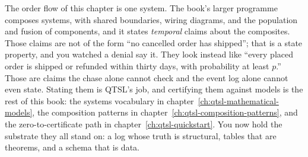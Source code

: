 The order flow of this chapter is one system. The book's larger
programme composes systems, with shared boundaries, wiring diagrams,
and the population and fusion of components, and it states
\emph{temporal} claims about the composites. Those claims are not of
the form ``no cancelled order has shipped''; that is a state property,
and you watched a denial say it. They look instead like ``every placed
order is shipped or refunded within thirty days, with probability at
least $p$.'' Those are claims the chase alone cannot check and the
event log alone cannot even state. Stating them is QTSL's job, and
certifying them against models is the rest of this book: the systems
vocabulary in chapter~\ref{ch:qtsl-mathematical-models}, the
composition patterns in chapter~\ref{ch:qtsl-composition-patterns},
and the zero-to-certificate path in chapter~\ref{ch:qtsl-quickstart}.
You now hold the substrate they all stand on: a log whose truth is
structural, tables that are theorems, and a schema that is data.

